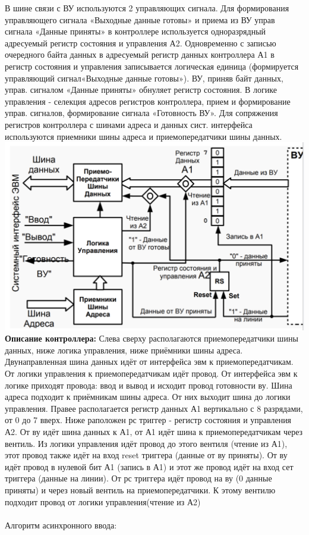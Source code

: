\documentclass{article}
\begin{document}
В шине связи с ВУ используются 2 управляющих сигнала. Для формирования управляющего сигнала «Выходные данные готовы» и приема из ВУ управ сигнала «Данные приняты» в контроллере используется одноразрядный адресуемый регистр состояния и управления А2. 
Одновременно с записью очередного байта данных в адресуемый регистр данных контроллера А1 в регистр состояния и управления записывается логическая единица (формируется управляющий сигнал«Выходные данные готовы»).
ВУ, приняв байт данных, управ. сигналом «Данные приняты» обнуляет регистр состояния.
В логике управления - селекция адресов регистров контроллера, прием и формирование управ. сигналов, формирование сигнала «Готовность ВУ».
Для сопряжения регистров контроллера с шинами адреса и данных сист. интерфейса используются приемники шины адреса и приемопередатчики шины данных.\\

\includegraphics[width=.8\textwidth]{in1.png}\\
\textbf{Описание контроллера:}
Слева сверху располагаются приемопередатчики шины данных, ниже логика управления, ниже приёмники шины адреса. Двунаправленная шина данных идёт от интерфейса эвм к приемопередатчикам. От логики управления к приемопередатчикам идёт провод. От интерфейса эвм к логике приходят провода: ввод и вывод и исходит провод готовности ву. 
Шина адреса подходит к приёмникам шины адреса. От них выходит шина до логики управления. 
Правее располагается регистр данных А1 вертикально с 8 разрядами, от 0 до 7 вверх. Ниже раположен рс триггер - регистр состояния и управления А2. 
От ву идёт шина данных к А1, от А1 идёт шина к приемопередатчикам через вентиль. 
Из логики управления идёт провод до этого вентиля (чтение из А1), этот провод также идёт на вход reset триггера (данные от ву приняты).
От ву идёт провод в нулевой бит А1 (запись в А1) и этот же провод идёт на вход сет триггера (данные на линии).
От рс триггера идёт провод на ву (0 данные приняты) и через новый вентиль на приемопередатчики. К этому вентилю подходит провод от логики управления(чтение из А2)
\\ \\
Алгоритм асинхронного ввода:
\end{document}
